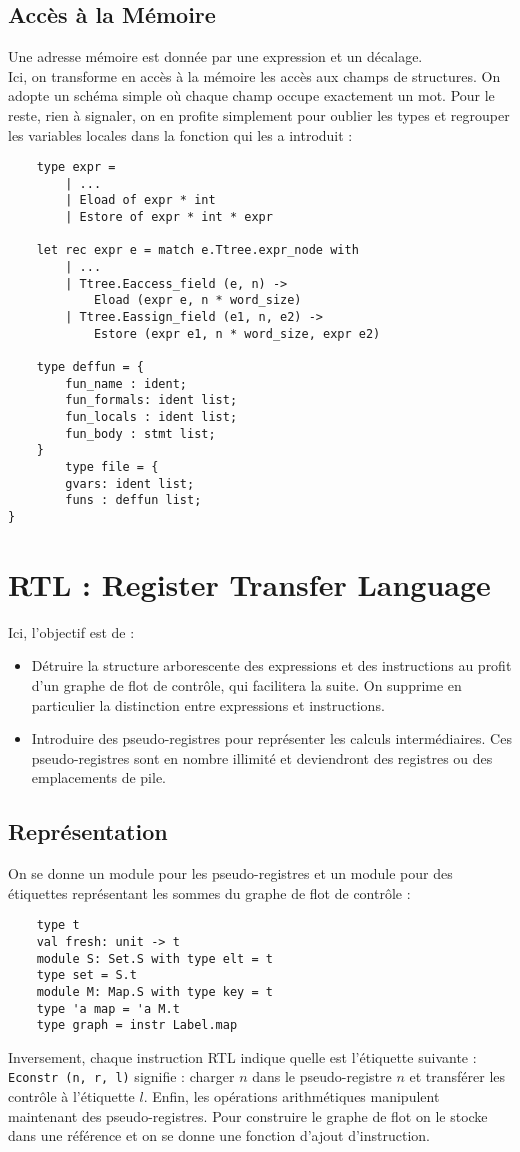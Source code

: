 \documentclass{cours}
\begin{document}
\subsection{Accès à la Mémoire}
Une adresse mémoire est donnée par une expression et un décalage.\\
Ici, on transforme en accès à la mémoire les accès aux champs de structures. On adopte un schéma simple où chaque champ occupe exactement un mot. Pour le reste, rien à signaler, on en profite simplement pour oublier les types et regrouper les variables locales dans la fonction qui les a introduit : 
\begin{verbatim}
    type expr =
        | ...
        | Eload of expr * int
        | Estore of expr * int * expr

    let rec expr e = match e.Ttree.expr_node with
        | ...
        | Ttree.Eaccess_field (e, n) ->
            Eload (expr e, n * word_size)
        | Ttree.Eassign_field (e1, n, e2) ->
            Estore (expr e1, n * word_size, expr e2)

    type deffun = {
        fun_name : ident;
        fun_formals: ident list;
        fun_locals : ident list;
        fun_body : stmt list;
    }
        type file = {
        gvars: ident list;
        funs : deffun list;
}
\end{verbatim}

\section{RTL : Register Transfer Language}
Ici, l'objectif est de : 
\begin{itemize}
    \item Détruire la structure arborescente des expressions et des instructions au profit d'un graphe de flot de contrôle, qui facilitera la suite. On supprime en particulier la distinction entre expressions et instructions. 
    \item Introduire des pseudo-registres pour représenter les calculs intermédiaires. Ces pseudo-registres sont en nombre illimité et deviendront des registres ou des emplacements de pile. 
\end{itemize}
\subsection{Représentation}
On se donne un module pour les pseudo-registres et un module pour des étiquettes représentant les sommes du graphe de flot de contrôle : 
\begin{verbatim}
    type t
    val fresh: unit -> t
    module S: Set.S with type elt = t
    type set = S.t
    module M: Map.S with type key = t
    type 'a map = 'a M.t
    type graph = instr Label.map

\end{verbatim}
Inversement, chaque instruction RTL indique quelle est l'étiquette suivante : \texttt{Econstr (n, r, l)} signifie : charger $n$ dans le pseudo-registre $n$ et transférer les contrôle à l'étiquette $l$. Enfin, les opérations arithmétiques manipulent maintenant des pseudo-registres. Pour construire le graphe de flot on le stocke dans une référence et on se donne une fonction d'ajout d'instruction. 
\end{document}
